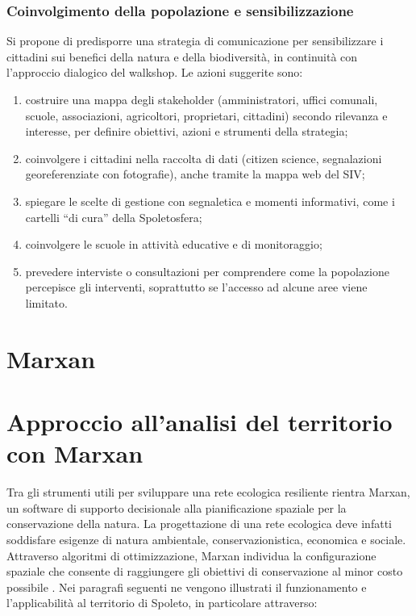 \documentclass[
  a4paper,
]{book}
\providecommand{\tightlist}{%
  \setlength{\itemsep}{0pt}\setlength{\parskip}{0pt}}
\begin{document}
\subsubsection{Coinvolgimento della popolazione e sensibilizzazione}\label{coinvolgimento-della-popolazione-e-sensibilizzazione}

Si propone di predisporre una strategia di comunicazione per sensibilizzare i cittadini sui benefici della natura e della biodiversità, in continuità con l'approccio dialogico del walkshop.
Le azioni suggerite sono:

\begin{enumerate}
\def\labelenumi{\arabic{enumi}.}
\tightlist
\item
  costruire una mappa degli stakeholder (amministratori, uffici comunali, scuole, associazioni, agricoltori, proprietari, cittadini) secondo rilevanza e interesse, per definire obiettivi, azioni e strumenti della strategia;
\item
  coinvolgere i cittadini nella raccolta di dati (citizen science, segnalazioni georeferenziate con fotografie), anche tramite la mappa web del SIV;
\item
  spiegare le scelte di gestione con segnaletica e momenti informativi, come i cartelli ``di cura'' della Spoletosfera;
\item
  coinvolgere le scuole in attività educative e di monitoraggio;
\item
  prevedere interviste o consultazioni per comprendere come la popolazione percepisce gli interventi, soprattutto se l'accesso ad alcune aree viene limitato.
\end{enumerate}

\section{Marxan}\label{marxan}

\section{Approccio all'analisi del territorio con Marxan}\label{approccio-allanalisi-del-territorio-con-marxan}

Tra gli strumenti utili per sviluppare una rete ecologica resiliente rientra Marxan, un software di supporto decisionale alla pianificazione spaziale per la conservazione della natura.
La progettazione di una rete ecologica deve infatti soddisfare esigenze di natura ambientale, conservazionistica, economica e sociale.
Attraverso algoritmi di ottimizzazione, Marxan individua la configurazione spaziale che consente di raggiungere gli obiettivi di conservazione al minor costo possibile \citep{ball2009}.
Nei paragrafi seguenti ne vengono illustrati il funzionamento e l'applicabilità al territorio di Spoleto, in particolare attraverso:
\end{document}
